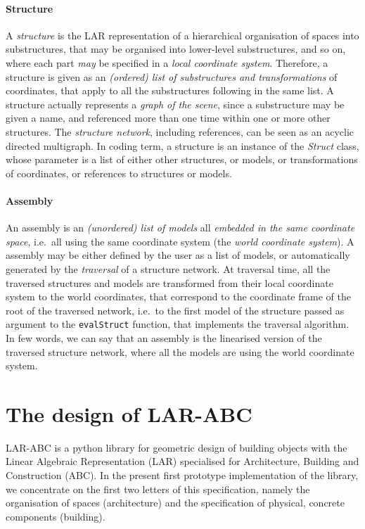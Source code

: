 \documentclass[11pt,oneside]{article}    %
\begin{document}
\paragraph{Structure}
A \emph{structure} is the LAR representation of a hierarchical organisation of spaces into substructures, that may be organised into lower-level substructures, and so on, where each part \emph{may} be  specified in a \emph{local coordinate system}. Therefore, a structure is given as an \emph{(ordered) list of substructures and transformations} of coordinates, that apply to all the substructures following in the same list. A structure actually represents a \emph{graph of the scene}, since a substructure may be given a name, and referenced more than one time within one or more other structures.  The \emph{structure network}, including references, can be seen as an acyclic directed multigraph. In coding term, a structure is an instance of the \emph{Struct} class, whose parameter is a list of either other structures, or models, or transformations of coordinates, or references to structures or models.

\paragraph{Assembly}
An assembly is an \emph{(unordered) list of models} all \emph{embedded in the same coordinate space}, i.e.~all using the same coordinate system (the \emph{world coordinate system}). A assembly may be either defined by the user as a list of models, or automatically generated by the \emph{traversal} of a structure network. At traversal time, all the traversed structures and models are transformed from their local coordinate system to the world coordinates, that correspond to the coordinate frame of the root of the traversed network, i.e.~to the first model of the structure passed as argument to the \texttt{evalStruct} function, that implements the traversal algorithm. In few words, we can say that an assembly is the linearised version of the traversed structure network, where all the models are using the world coordinate system.

\section{The design of LAR-ABC}

LAR-ABC is a python library for geometric design of building objects with the Linear Algebraic Representation (LAR) specialised for Architecture, Building and Construction (ABC). In the present first prototype implementation of the library, we concentrate on the first two letters of this specification, namely the organisation of spaces (architecture) and the specification of physical, concrete components (building). 
\end{document}
